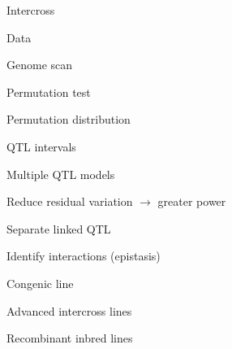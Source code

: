 \documentclass[aspectratio=169,12pt,t]{beamer}
\begin{document}
\begin{frame}[c]{Intercross}
\end{frame}


\begin{frame}[c]{Data}
\end{frame}



\begin{frame}[c]{Genome scan}
\bigskip



\end{frame}



\begin{frame}[c]{Permutation test}
\end{frame}


\begin{frame}[c]{Permutation distribution}
\end{frame}



\begin{frame}[c]{QTL intervals}
\end{frame}



\begin{frame}{Multiple QTL models}

  \bbi
\item Reduce residual variation $\longrightarrow$ greater power
\item Separate linked QTL
\item Identify interactions {\lolit (epistasis)}
  \ei

\end{frame}


\begin{frame}[c]{Congenic line}
\end{frame}

\begin{frame}[c]{Advanced intercross lines}
\end{frame}


\begin{frame}[c]{Recombinant inbred lines}
\end{frame}
\end{document}
